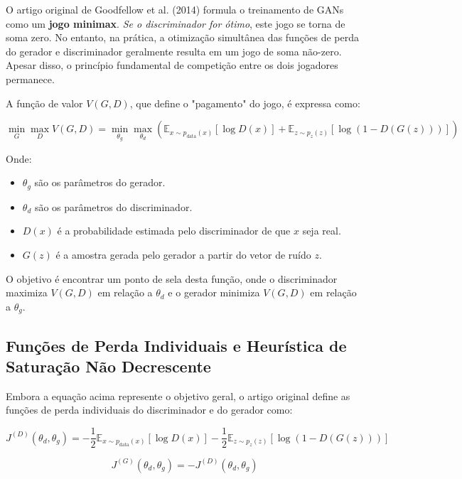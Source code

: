 \documentclass{tufte-handout}
\begin{document}
O artigo original de Goodfellow et al. (2014) formula o treinamento de GANs como um \textbf{jogo minimax}. \textit{Se o discriminador for ótimo}, este jogo se torna de soma zero. No entanto, na prática, a otimização simultânea das funções de perda do gerador e discriminador geralmente resulta em um jogo de soma não-zero. Apesar disso, o princípio fundamental de competição entre os dois jogadores permanece.

A função de valor $V(G, D)$, que define o "pagamento" do jogo, é expressa como:

\begin{equation}
    \min_G \max_D V(G, D) = \min_{\theta_g} \max_{\theta_d} \left( \mathbb{E}_{x \sim p_{\text{data}}(x)} \left[ \log D(x) \right] + \mathbb{E}_{z \sim p_z(z)} \left[ \log (1 - D(G(z))) \right] \right)
\end{equation}

Onde:
\begin{itemize}
    \item $\theta_g$ são os parâmetros do gerador.
    \item $\theta_d$ são os parâmetros do discriminador.
    \item $D(x)$ é a probabilidade estimada pelo discriminador de que $x$ seja real.
    \item $G(z)$ é a amostra gerada pelo gerador a partir do vetor de ruído $z$.
\end{itemize}

O objetivo é encontrar um ponto de sela desta função, onde o discriminador maximiza $V(G, D)$ em relação a $\theta_d$ e o gerador minimiza $V(G, D)$ em relação a $\theta_g$.

\subsection{Funções de Perda Individuais e Heurística de Saturação Não Decrescente}

Embora a equação acima represente o objetivo geral, o artigo original define as funções de perda individuais do discriminador e do gerador como:

\begin{equation}
    J^{(D)}(\theta_d, \theta_g) = - \frac{1}{2} \mathbb{E}_{x \sim p_{\text{data}}(x)} \left[ \log D(x) \right] - \frac{1}{2} \mathbb{E}_{z \sim p_z(z)} \left[ \log (1 - D(G(z))) \right]
\end{equation}

\begin{equation}
    J^{(G)}(\theta_d, \theta_g) = - J^{(D)}(\theta_d, \theta_g)
\end{equation}
\end{document}
